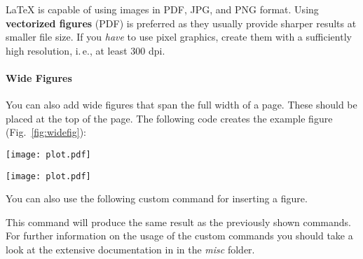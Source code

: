 LaTeX is capable of using images in PDF, JPG, and PNG format. Using \textbf{vectorized figures} (PDF) is preferred as they usually provide sharper results at smaller file size. If you \emph{have} to use pixel graphics, create them with a sufficiently high resolution, i.\,e., at least 300 dpi.


\paragraph{Wide Figures} You can also add wide figures that span the full width of a page. These should be placed at the top of the page. The following code creates the example figure (Fig.~\ref{fig:widefig}):
\begin{latex}
\begin{figure*}[t] %
\texttt{[image: plot.pdf]}
\caption{\label{fig:widefig}
  This is a full-width figure. Lorem ipsum dolor sit amet, …
}
\end{figure*}
\end{latex}

\begin{figure*}[t]
\texttt{[image: plot.pdf]}
\caption{\label{fig:widefig}This is a full-width figure. Lorem ipsum dolor sit amet, consectetur adipisicing elit, sed do eiusmod tempor incididunt ut labore et dolore magna aliqua. Ut enim ad minim veniam, quis nostrud exercitation ullamco laboris nisi ut aliquip ex ea commodo consequat.}
\end{figure*}

You can also use the following custom command  for inserting a figure.

\begin{latex}
\end{latex}

This command will produce the same result as the previously shown commands.
For further information on the usage of the custom commands you should take a look at the extensive documentation in  in the \emph{misc} folder.

